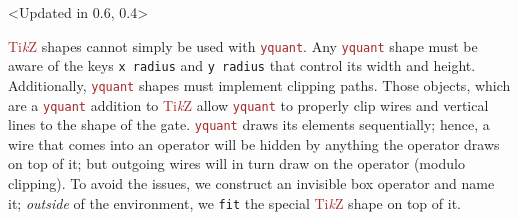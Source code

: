 \documentclass{scrartcl}
\makeatletter
\newenvironment{codeexample*}{%
   \VerbatimEnvironment%
   \let\FVB@VerbatimOut\minted@FVB@VerbatimOut
   \let\FVE@VerbatimOut\minted@FVE@VerbatimOut
   \minted@configlang{tex}%
   \minted@fvset
   \begin{VerbatimOut}[codes={\catcode`\^^I=12},firstline,lastline]{\minted@jobname.pyg}%
}{
   \end{VerbatimOut}%
   \minted@langlinenoson%
   \begin{adjustbox}{center}
       \minted@jobname.pyg %
   \end{adjustbox}\nopagebreak
   \expandafter\minted@pygmentize\expandafter{\minted@lang}%
   \minted@langlinenosoff%
   \par%
}
\def\TikZ{\textcolor{brown}{Ti\textit kZ}}
\def\pkg#1{\textcolor{brown}{\texttt{#1}}}
\def\texlink{\link\tex}
\def\Yquant{\pkg{yquant}}
\makeatother
\begin{document}
               \begin{example}<Updated in 0.6, 0.4>
                  \begin{codeexample*}
                  \end{codeexample*}
                  \TikZ{} shapes cannot simply be used with \Yquant.
                  Any \Yquant{} shape must be aware of the keys \texttt{x radius} and \texttt{y radius} that control its width and height.
                  Additionally, \Yquant{} shapes must implement clipping paths.
                  Those objects, which are a \Yquant{} addition to \TikZ{} allow \Yquant{} to properly clip wires and vertical lines to the shape of the gate.
                  \Yquant{} draws its elements sequentially; hence, a wire that comes into an operator will be hidden by anything the operator draws on top of it; but outgoing wires will in turn draw on the operator (modulo clipping).
                  To avoid the issues, we construct an invisible box operator and name it; \emph{outside} of the \texlink{yquant} environment, we \texttt{fit} the special \TikZ{} shape on top of it.
               \end{example}
\end{document}
